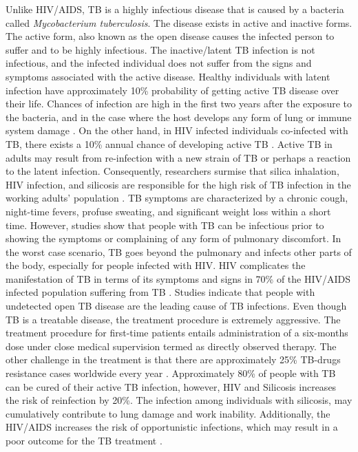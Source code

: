 Unlike HIV/AIDS, TB is a highly infectious disease that is caused by a bacteria called \textit{Mycobacterium tuberculosis}. The disease exists in active and inactive forms. The active form, also known as the open disease causes the infected person to suffer and to be highly infectious. The inactive/latent TB infection is not infectious, and the infected individual does not suffer from the signs and symptoms associated with the active disease. Healthy individuals with latent infection have approximately 10\% probability of getting active TB disease over their life. Chances of infection are high in the first two years after the exposure to the bacteria, and in the case where the host develops any form of lung or immune system damage \cite{kaufmann_handbook_2008,zumla_handbook_2009}. On the other hand, in HIV infected individuals co-infected with TB, there exists a 10\% annual chance of developing active TB \cite{raviglione_tuberculosis_1997,sharma_hiv-tb_2005,toossi_impact_2001}. Active TB in adults may result from re-infection with a new strain of TB or perhaps a reaction to the latent infection. Consequently, researchers surmise that silica inhalation, HIV infection, and silicosis are responsible for the high risk of TB infection in the working adults’ population \cite{sharma_hiv-tb_2005,danibrosio_epidemiology_2014}.
TB symptoms are characterized by a chronic cough, night-time fevers, profuse sweating, and significant weight loss within a short time. However, studies show that people with TB can be infectious prior to showing the symptoms or complaining of any form of pulmonary discomfort. In the worst case scenario, TB goes beyond the pulmonary and infects other parts of the body, especially for people infected with HIV. HIV complicates the manifestation of TB in terms of its symptoms and signs in 70\% of the HIV/AIDS infected population suffering from TB \cite{sharma_hiv-tb_2005}. Studies indicate that people with undetected open TB disease are the leading cause of TB infections. Even though TB is a treatable disease, the treatment procedure is extremely aggressive. The treatment procedure for first-time patients entails administration of a six-months dose under close medical supervision termed as directly observed therapy. The other challenge in the treatment is that there are approximately 25\% TB-drugs resistance cases worldwide every year \cite{centers_for_disease_control_and_prevention_cdc_emergence_2006,world_health_organization_multidrug_2010}. Approximately 80\% of people with TB can be cured of their active TB infection, however, HIV and Silicosis increases the risk of reinfection by 20\%. The infection among individuals with silicosis, may cumulatively contribute to lung damage and work inability. Additionally, the HIV/AIDS increases the risk of opportunistic infections, which may result in a poor outcome for the TB treatment \cite{cowie_epidemiology_1994,mulenga_silicosis_2013,rees_silica_2007}.\\
